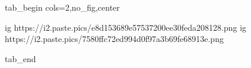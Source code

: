  
 
 
 
 


\ifcmt
  tab_begin cols=2,no_fig,center

    ig https://i2.paste.pics/e8d153689e57537200ee30feda208128.png
    ig https://i2.paste.pics/7580ffc72ed994d0f97a3b69fe68913e.png

  tab_end
\fi
